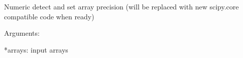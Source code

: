 \documentclass[a4paper,11pt,english]{sphinxmanual}
\begin{document}
\begin{fulllineitems}
\begin{fulllineitems}
\end{fulllineitems}


\begin{fulllineitems}
\label{modules_doc:cbmpy.PyscesStoich.MathArrayFunc.commonType}
Numeric detect and set array precision (will be replaced with new scipy.core compatible code when ready)

Arguments:

*arrays: input arrays

\end{fulllineitems}


\end{fulllineitems}

\end{document}
